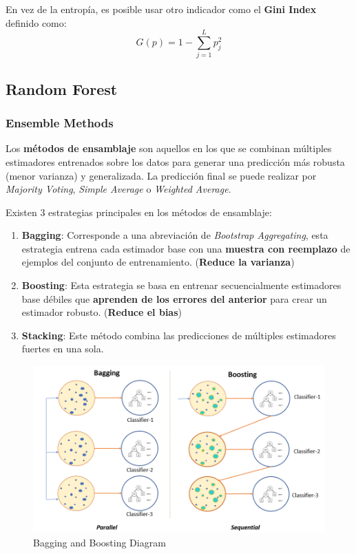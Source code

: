 En vez de la entropía, es posible usar otro indicador como el \textbf{Gini Index} definido como: 
$$G(p) = 1 - \sum_{j=1}^L p_j^2$$

\subsection{Random Forest}

\subsubsection{Ensemble Methods}

Los \textbf{métodos de ensamblaje} son aquellos en los que se combinan múltiples estimadores entrenados sobre los datos para generar una predicción más robusta (menor varianza) y generalizada. La predicción final se puede realizar por \textit{Majority Voting}, \textit{Simple Average} o \textit{Weighted Average}.

Existen 3 estrategias principales en los métodos de ensamblaje: 
\begin{enumerate}
    \item \textbf{Bagging}: Corresponde a una abreviación de \textit{Bootstrap Aggregating}, esta estrategia entrena cada estimador base con una \textbf{muestra con reemplazo} de ejemplos del conjunto de entrenamiento. (\textbf{Reduce la varianza})
    \item \textbf{Boosting}: Esta estrategia se basa en entrenar secuencialmente estimadores base débiles que \textbf{aprenden de los errores del anterior} para crear un estimador robusto. (\textbf{Reduce el bias})
    \item \textbf{Stacking}: Este método combina las predicciones de múltiples estimadores fuertes en una sola. 
\end{enumerate}

\begin{figure}[H]
    \center
    \includegraphics[scale=0.25]{notebooks/ML/img/bagging_and_boosting_diagram.png}
    \caption{Bagging and Boosting Diagram}
\end{figure}


